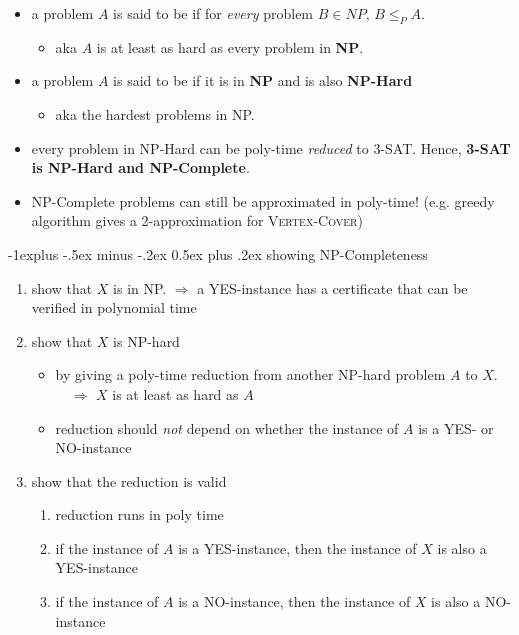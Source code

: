 \documentclass[10pt, landscape]{article}
\makeatletter
\renewcommand{\subsection}{\@startsection{subsection}{2}{0mm}%
  {-1explus -.5ex minus -.2ex}%
  {0.5ex plus .2ex}%
{\normalfont\normalsize\bfseries}}
\makeatother
\begin{document}
\begin{multicols*}{4}
  \begin{itemize}
    \item a problem $A$ is said to be  if for \textit{every} problem $B \in NP$, $B \leq_P A$.
      \begin{itemize}
        \item aka $A$ is at least as hard as every problem in \textbf{NP}.
      \end{itemize}
    \item a problem $A$ is said to be  if it is in \textbf{NP} and is also \textbf{NP-Hard}
      \begin{itemize}
        \item aka the hardest problems in NP.
      \end{itemize}
    \item {} every problem in NP-Hard can be poly-time \textit{reduced} to 3-SAT. Hence, \textbf{3-SAT is NP-Hard and NP-Complete}.
    \item NP-Complete problems can still be approximated in poly-time! (e.g. greedy algorithm gives a 2-approximation for \textsc{Vertex-Cover})
  \end{itemize}

  \subsection{showing NP-Completeness}

  \begin{enumerate}
    \item show that $X$ is in NP. $\Rightarrow$ a YES-instance has a certificate that can be verified in polynomial time
    \item show that $X$ is NP-hard
      \begin{itemize}
        \item by giving a poly-time reduction from another NP-hard problem $A$ to $X$.
          $\quad \Rightarrow$ $X$ is at least as hard as $A$
        \item reduction should \textit{not} depend on whether the instance of $A$ is a YES- or NO-instance
      \end{itemize}
    \item show that the reduction is valid
      \begin{enumerate}
        \item reduction runs in poly time
        \item if the instance of $A$ is a YES-instance, then the instance of $X$ is also a YES-instance
        \item if the instance of $A$ is a NO-instance, then the instance of $X$ is also a NO-instance
      \end{enumerate}
  \end{enumerate}


\end{multicols*}
\end{document}
